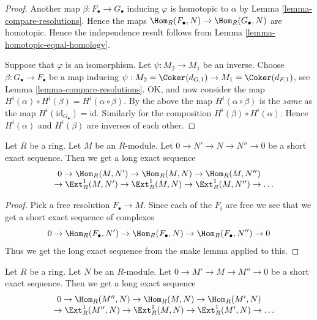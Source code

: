 \begin{proof}
Another map $\beta : F_{\bullet} \to G_{\bullet}$
inducing $\varphi$ is homotopic to $\alpha$ by
Lemma \ref{lemma-compare-resolutions}. Hence the
maps $\Hom_R(F_\bullet, N) \to
\Hom_R(G_\bullet, N)$ are homotopic.
Hence the independence result follows from
Lemma \ref{lemma-homotopic-equal-homology}.

\medskip\noindent
Suppose that $\varphi$ is an isomorphism.
Let $\psi : M_2 \to M_1$ be an inverse.
Choose $\beta : G_{\bullet} \to F_{\bullet}$
be a map inducing $\psi :
M_2 = \Coker(d_{G, 1}) \to M_1 = \Coker(d_{F, 1})$,
see Lemma \ref{lemma-compare-resolutions}.
OK, and now consider the map
$H^i(\alpha) \circ H^i(\beta) =
H^i(\alpha \circ \beta)$. By the above the
map $H^i(\alpha \circ \beta)$ is the {\it same}
as the map $H^i(\text{id}_{G_{\bullet}}) = \text{id}$.
Similarly for the composition $H^i(\beta) \circ H^i(\alpha)$.
Hence $H^i(\alpha)$ and $H^i(\beta)$ are inverses of each other.
\end{proof}

\begin{lemma}
\label{lemma-long-exact-seq-ext}
Let $R$ be a ring. Let $M$ be an $R$-module.
Let $0 \to N' \to N \to N'' \to 0$ be a
short exact sequence. Then we get a long exact
sequence
$$
\begin{matrix}
0
\to \Hom_R(M, N')
\to \Hom_R(M, N)
\to \Hom_R(M, N'')
\\
\phantom{0\ }
\to \Ext^1_R(M, N')
\to \Ext^1_R(M, N)
\to \Ext^1_R(M, N'')
\to \ldots
\end{matrix}
$$
\end{lemma}

\begin{proof}
Pick a free resolution $F_{\bullet} \to M$.
Since each of the $F_i$ are free we see that
we get a short exact sequence of complexes
$$
0 \to
\Hom_R(F_{\bullet}, N') \to
\Hom_R(F_{\bullet}, N) \to
\Hom_R(F_{\bullet}, N'') \to
0
$$
Thus we get the long exact sequence from
the snake lemma applied to this.
\end{proof}

\begin{lemma}
\label{lemma-reverse-long-exact-seq-ext}
Let $R$ be a ring. Let $N$ be an $R$-module.
Let $0 \to M' \to M \to M'' \to 0$ be a
short exact sequence. Then we get a long exact
sequence
$$
\begin{matrix}
0
\to \Hom_R(M'', N)
\to \Hom_R(M, N)
\to \Hom_R(M', N)
\\
\phantom{0\ }
\to \Ext^1_R(M'', N)
\to \Ext^1_R(M, N)
\to \Ext^1_R(M', N)
\to \ldots
\end{matrix}
$$
\end{lemma}

